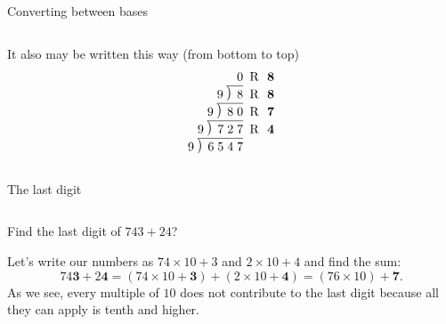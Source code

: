 \documentclass[9pt,aspectratio=169]{beamer}
\newcommand\Mydiv[2]{%
$\strut#1$\kern.25em\smash{\raise.3ex\hbox{$\big)$}}$\mkern-8mu
        \overline{\enspace\strut#2}$}
\begin{document}
\begin{frame}{Converting between bases}
\begin{columns}[T]
\begin{column}{0.5\textwidth}
      It also may be written this way (from bottom to top)
      \[
        \setlength\arraycolsep{0.6ex}
        \begin{array}{rl}
          0 & \text{R}\ \ \mathbf{8} \\
          $\Mydiv{9}{\ 8}$ & \text{R}\ \ \mathbf{8} \\
          $\Mydiv{9}{\ 8\;0}$ & \text{R}\ \ \mathbf{7} \\
          $\Mydiv{9}{\ 7\;2\;7}$ & \text{R}\ \ \mathbf{4} \\
          $\Mydiv{9}{\ 6\;5\;4\;7}$ &
        \end{array}
      \]
    \end{column}
  \end{columns}
\end{frame}

\begin{frame}{The last digit}
  \begin{columns}[T]
    \begin{column}{0.5\textwidth}
      \begin{problem}
        Find the last digit of $743 + 24$?        
      \end{problem}
      Let's write our numbers as $74 \times 10 + 3$ and $2 \times 10 + 4$ and find the sum:
      \[ 74\mathbf{3} + 2\mathbf{4} = (74 \times 10 + \mathbf{3}) + (2 \times 10 + \mathbf{4}) = (76 \times 10) + \mathbf{7}.\]
      As we see, every multiple of $10$ does not contribute to the last digit because all they can apply is tenth and higher.\smallskip


\end{column}
\end{columns}
\end{frame}
\end{document}
